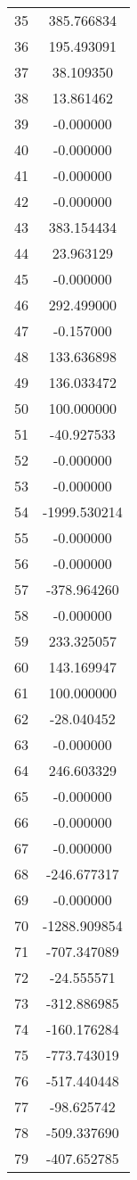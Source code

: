 \documentclass[12pt]{article}
\begin{document}
\begin{longtable}{@{}cc@{}}
35 & 385.766834 \\
36 & 195.493091 \\
37 & 38.109350 \\
38 & 13.861462 \\
39 & -0.000000 \\
40 & -0.000000 \\
41 & -0.000000 \\
42 & -0.000000 \\
43 & 383.154434 \\
44 & 23.963129 \\
45 & -0.000000 \\
46 & 292.499000 \\
47 & -0.157000 \\
48 & 133.636898 \\
49 & 136.033472 \\
50 & 100.000000 \\
51 & -40.927533 \\
52 & -0.000000 \\
53 & -0.000000 \\
54 & -1999.530214 \\
55 & -0.000000 \\
56 & -0.000000 \\
57 & -378.964260 \\
58 & -0.000000 \\
59 & 233.325057 \\
60 & 143.169947 \\
61 & 100.000000 \\
62 & -28.040452 \\
63 & -0.000000 \\
64 & 246.603329 \\
65 & -0.000000 \\
66 & -0.000000 \\
67 & -0.000000 \\
68 & -246.677317 \\
69 & -0.000000 \\
70 & -1288.909854 \\
71 & -707.347089 \\
72 & -24.555571 \\
73 & -312.886985 \\
74 & -160.176284 \\
75 & -773.743019 \\
76 & -517.440448 \\
77 & -98.625742 \\
78 & -509.337690 \\
79 & -407.652785 \\

\end{longtable}
\end{document}
